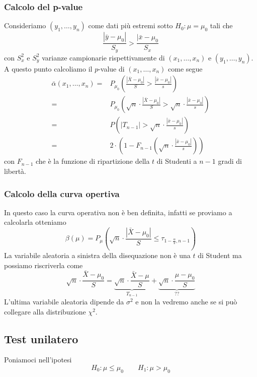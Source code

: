 \subsubsection{Calcolo del p-value}
Consideriamo $(y_1, \dots, y_n)$ come dati più estremi sotto $H_0 : \mu = \mu_0$ tali che
\[ \frac{|\bar{y} - \mu_0|}{S_y} > \frac{|\bar{x} - \mu_0}{S_x} \]
con $S_x^2$ e $S_y^2$ varianze campionarie rispettivamente di $(x_1, \dots, x_n)$ e
$(y_1, \dots, y_n)$. A questo punto calcoliamo il $p$-value di $(x_1, \dots, x_n)$ come segue
\begin{align*}
	\bar{\alpha}(x_1, \dots, x_n) = & P_{\mu_0} \left( \frac{|\bar{X} - \mu_0|}{S} >
	\frac{|\bar{x} - \mu_0|}{s} \right)                                                \\
	=                               & P_{\mu_0} \left( \sqrt{n} \cdot
	\frac{|\bar{X} - \mu_0|}{S} > \sqrt{n} \cdot \frac{|\bar{x} - \mu_0|}{s} \right)   \\
	=                               & P \left( |T_{n-1}| >
	\sqrt{n} \cdot \frac{|\bar{x} - \mu_0|}{s} \right)                                 \\
	=                               & 2 \cdot \left( 1 - F_{n-1} \left( \sqrt{n} \cdot
	\frac{|\bar{x} - \mu_0|}{s} \right) \right)
\end{align*}
con $F_{n-1}$ che è la funzione di ripartizione della $t$ di Studenti a $n-1$ gradi di libertà.

\subsubsection{Calcolo della curva opertiva}
In questo caso la curva operativa non è ben definita, infatti se proviamo a calcolarla otteniamo
\[
	\beta (\mu) = P_\mu \left( \sqrt{n} \cdot \frac{|\bar{X} - \mu_0|}{S}
	\leq \tau_{1 - \frac{\alpha}{2}, n-1} \right)
\]
La variabile aleatoria a sinistra della disequazione non è una $t$ di Student ma possiamo
riscriverla come
\[
	\sqrt{n}  \cdot \frac{\bar{X} - \mu_0}{S} =
	\underbrace{\sqrt{n} \cdot \frac{\bar{X} - \mu}{S}}_{T_{n-1}} +
	\underbrace{\sqrt{n}  \cdot \frac{\mu - \mu_0}{S}}_{??}
\]
L'ultima variabile aleatoria dipende da $\sigma^2$ e non la vedremo anche se si può collegare alla
distribuzione $\chi^2$.

\subsection{Test unilatero}
Poniamoci nell'ipotesi
\[ H_0 : \mu \leq \mu_0 \qquad H_1 : \mu > \mu_0 \]

